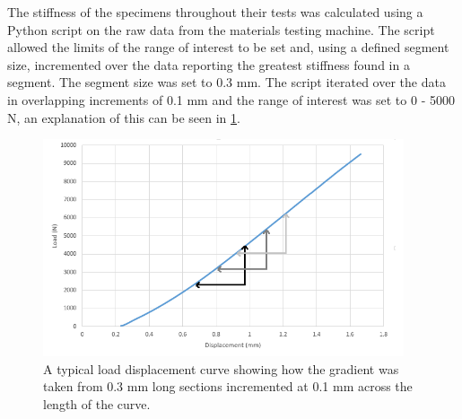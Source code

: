 

The stiffness of the specimens throughout their tests was calculated using a
Python script on the raw data from the materials testing machine.
The script allowed the limits of the range of interest to be set and,
using a defined segment size, incremented over the data reporting the greatest
stiffness found in a segment. The segment size was set to 0.3 mm. The script
iterated over the data in overlapping increments of 0.1 mm and the range of
interest was set to 0 - 5000 N, an explanation of this can be seen in \cref{fig:load_disp_incr}.

\begin{figure}[ht!]

\centering
\includegraphics[width=4.18472in]{images/load_disp_incr.png}
\caption{A typical load displacement curve showing how the gradient was taken from 0.3 mm long sections incremented at 0.1 mm across the length of the curve.}
\label{fig:load_disp_incr}
\end{figure}

